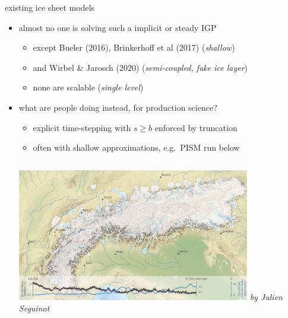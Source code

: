 \documentclass[usepdftitle=false,usenames,dvipsnames]{beamer}
\begin{document}
\begin{frame}{existing ice sheet models}

\begin{itemize}
\item almost no one is solving such a implicit or steady IGP
    \begin{itemize}
    \item except Bueler (2016), Brinkerhoff et al (2017) (\emph{shallow})
    \item and Wirbel \& Jarosch (2020) (\emph{semi-coupled, fake ice layer})
    \item none are scalable (\emph{single level})
    \end{itemize}
\item what are people doing instead, for production science?
    \begin{itemize}
    \item \alert{explicit time-stepping with $s \ge b$ enforced by truncation}
    \item often with shallow approximations, e.g.~PISM run below
    \end{itemize}

\medskip
\begin{columns}
        \includegraphics[width=0.8\textwidth]{figs/seguinot.png}
        \scriptsize \emph{by Julien Seguinot}
\end{columns}
\end{itemize}
\end{frame}
\end{document}
